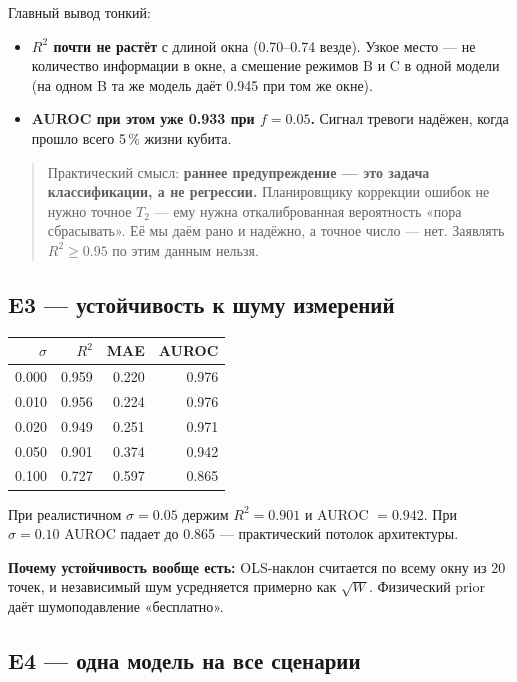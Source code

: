 \documentclass[12pt,a4paper]{article}
\begin{document}
Главный вывод тонкий:

\begin{itemize}
  \item \textbf{$R^2$ почти не растёт} с длиной окна (0.70–0.74 везде). Узкое
        место — не количество информации в окне, а смешение режимов B и C в
        одной модели (на одном B та же модель даёт 0.945 при том же окне).
  \item \textbf{AUROC при этом уже 0.933 при $f=0.05$.} Сигнал тревоги надёжен,
        когда прошло всего 5\,\% жизни кубита.
\end{itemize}

\begin{quote}
Практический смысл: \textbf{раннее предупреждение — это задача классификации, а
не регрессии.} Планировщику коррекции ошибок не нужно точное $T_2$ — ему нужна
откалиброванная вероятность «пора сбрасывать». Её мы даём рано и надёжно, а
точное число — нет. Заявлять $R^2\geq 0.95$ по этим данным нельзя.
\end{quote}

\subsection{E3 — устойчивость к шуму измерений}

\begin{center}
\begin{tabular}{@{}rrrr@{}}
\toprule
$\sigma$ & $R^2$ & MAE & AUROC \\
\midrule
0.000 & 0.959 & 0.220 & 0.976 \\
0.010 & 0.956 & 0.224 & 0.976 \\
0.020 & 0.949 & 0.251 & 0.971 \\
0.050 & 0.901 & 0.374 & 0.942 \\
0.100 & 0.727 & 0.597 & 0.865 \\
\bottomrule
\end{tabular}
\end{center}

При реалистичном $\sigma=0.05$ держим $R^2=0.901$ и AUROC $=0.942$. При
$\sigma=0.10$ AUROC падает до 0.865 — практический потолок архитектуры.

\textbf{Почему устойчивость вообще есть:} OLS-наклон считается по всему окну из
20 точек, и независимый шум усредняется примерно как $\sqrt{W}$. Физический
prior даёт шумоподавление «бесплатно».

\subsection{E4 — одна модель на все сценарии}
\end{document}
